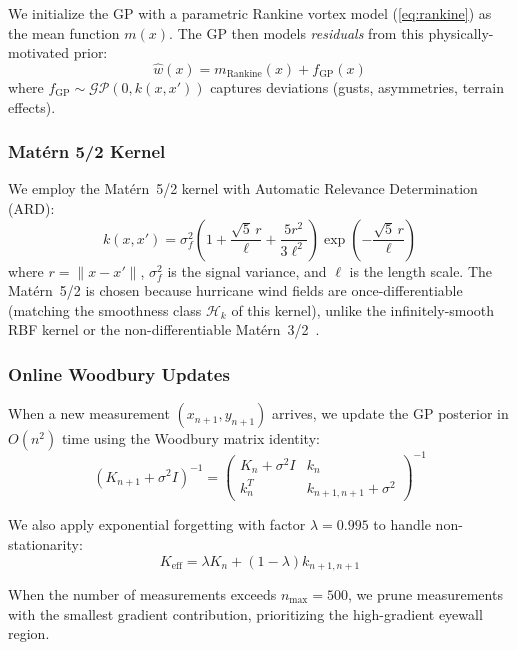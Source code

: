 \documentclass[11pt,twocolumn]{article}
\providecommand{\Cref}[1]{\ref{#1}}
\theoremstyle{definition}
\newcommand{\cH}{\mathcal{H}}
\newcommand{\GP}{\mathcal{GP}}
\begin{document}
We initialize the GP with a parametric Rankine vortex model (\Cref{eq:rankine}) as the mean function $m(x)$. The GP then models \emph{residuals} from this physically-motivated prior:
\begin{equation}
\hat{w}(x) = m_{\text{Rankine}}(x) + f_{\text{GP}}(x)
\end{equation}
where $f_{\text{GP}} \sim \GP(0, k(x, x'))$ captures deviations (gusts, asymmetries, terrain effects).

\subsubsection{Mat\'ern 5/2 Kernel}

We employ the Mat\'ern~5/2 kernel with Automatic Relevance Determination (ARD):
\begin{equation}
\label{eq:matern}
k(x, x') = \sigma_f^2 \left(1 + \frac{\sqrt{5}\,r}{\ell} + \frac{5r^2}{3\ell^2}\right) \exp\left(-\frac{\sqrt{5}\,r}{\ell}\right)
\end{equation}
where $r = \|x - x'\|$, $\sigma_f^2$ is the signal variance, and $\ell$ is the length scale. The Mat\'ern~5/2 is chosen because hurricane wind fields are once-differentiable (matching the smoothness class $\cH_k$ of this kernel), unlike the infinitely-smooth RBF kernel or the non-differentiable Mat\'ern~3/2~\citep{Rasmussen2006}.

\subsubsection{Online Woodbury Updates}

When a new measurement $(x_{n+1}, y_{n+1})$ arrives, we update the GP posterior in $O(n^2)$ time using the Woodbury matrix identity:
\begin{equation}
\label{eq:woodbury}
(K_{n+1} + \sigma^2 I)^{-1} = \begin{pmatrix} K_n + \sigma^2 I & k_n \\ k_n^T & k_{n+1,n+1} + \sigma^2 \end{pmatrix}^{-1}
\end{equation}

We also apply exponential forgetting with factor $\lambda = 0.995$ to handle non-stationarity:
\begin{equation}
K_{\text{eff}} = \lambda K_n + (1 - \lambda) k_{n+1,n+1}
\end{equation}

When the number of measurements exceeds $n_{\max} = 500$, we prune measurements with the smallest gradient contribution, prioritizing the high-gradient eyewall region.
\end{document}
